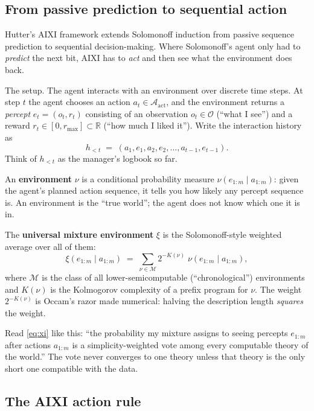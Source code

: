 \subsection*{From passive prediction to sequential action}

Hutter's AIXI framework \citep{hutter2005universal} extends Solomonoff
induction from passive sequence prediction to sequential
decision-making.  Where Solomonoff's agent only had to \emph{predict}
the next bit, AIXI has to \emph{act} and then see what the environment
does back.

The setup.  The agent interacts with an environment over discrete time
steps.  At step $t$ the agent chooses an action $a_t \in
\mathcal{A}_{\mathrm{act}}$, and the environment returns a
\emph{percept} $e_t = (o_t, r_t)$ consisting of an observation $o_t
\in \mathcal{O}$ (``what I see'') and a reward $r_t \in [0,
r_{\max}]\subset\mathbb{R}$ (``how much I liked it'').  Write the
interaction history as
\[
  h_{<t} \;=\; (a_1, e_1, a_2, e_2, \dots, a_{t-1}, e_{t-1}).
\]
Think of $h_{<t}$ as the manager's logbook so far.

An \textbf{environment} $\nu$ is a conditional probability measure
$\nu(e_{1:m}\mid a_{1:m})$: given the agent's planned action sequence,
it tells you how likely any percept sequence is.  An environment is
the ``true world''; the agent does not know which one it is in.

The \textbf{universal mixture environment} $\xi$ is the
Solomonoff-style weighted average over all of them:
\begin{equation}
  \xi(e_{1:m} \mid a_{1:m})
  \;=\; \sum_{\nu \in \mathcal{M}} 2^{-K(\nu)}\;\nu(e_{1:m} \mid a_{1:m}),
  \label{eq:xi}
\end{equation}
where $\mathcal{M}$ is the class of all lower-semicomputable
(``chronological'') environments and $K(\nu)$ is the Kolmogorov
complexity of a prefix program for $\nu$.  The weight $2^{-K(\nu)}$ is
Occam's razor made numerical: halving the description length
\emph{squares} the weight.

\begin{intuition}
Read \eqref{eq:xi} like this: ``the probability my mixture assigns to
seeing percepts $e_{1:m}$ after actions $a_{1:m}$ is a
simplicity-weighted vote among every computable theory of the world.''
The vote never converges to one theory unless that theory is the only
short one compatible with the data.
\end{intuition}

\subsection*{The AIXI action rule}

